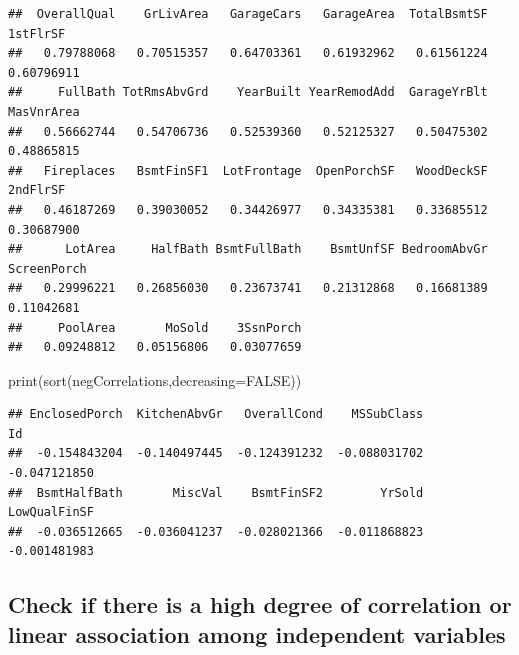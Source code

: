 \documentclass[aoas]{imsart}
\newenvironment{Shaded}{\begin{snugshade}}{\end{snugshade}}
\newcommand{\AttributeTok}[1]{\textcolor[rgb]{0.77,0.63,0.00}{#1}}
\newcommand{\CommentTok}[1]{\textcolor[rgb]{0.56,0.35,0.01}{\textit{#1}}}
\newcommand{\ConstantTok}[1]{\textcolor[rgb]{0.00,0.00,0.00}{#1}}
\newcommand{\FunctionTok}[1]{\textcolor[rgb]{0.00,0.00,0.00}{#1}}
\newcommand{\NormalTok}[1]{#1}
\newcommand{\OtherTok}[1]{\textcolor[rgb]{0.56,0.35,0.01}{#1}}
\newcommand{\SpecialCharTok}[1]{\textcolor[rgb]{0.00,0.00,0.00}{#1}}
\newcommand{\StringTok}[1]{\textcolor[rgb]{0.31,0.60,0.02}{#1}}
\numberwithin{equation}{section}
\theoremstyle{plain}
\theoremstyle{remark}
\begin{document}
\begin{verbatim}
##  OverallQual    GrLivArea   GarageCars   GarageArea  TotalBsmtSF     1stFlrSF 
##   0.79788068   0.70515357   0.64703361   0.61932962   0.61561224   0.60796911 
##     FullBath TotRmsAbvGrd    YearBuilt YearRemodAdd  GarageYrBlt   MasVnrArea 
##   0.56662744   0.54706736   0.52539360   0.52125327   0.50475302   0.48865815 
##   Fireplaces   BsmtFinSF1  LotFrontage  OpenPorchSF   WoodDeckSF     2ndFlrSF 
##   0.46187269   0.39030052   0.34426977   0.34335381   0.33685512   0.30687900 
##      LotArea     HalfBath BsmtFullBath    BsmtUnfSF BedroomAbvGr  ScreenPorch 
##   0.29996221   0.26856030   0.23673741   0.21312868   0.16681389   0.11042681 
##     PoolArea       MoSold    3SsnPorch 
##   0.09248812   0.05156806   0.03077659
\end{verbatim}

\begin{Shaded}
\begin{Highlighting}[]
\FunctionTok{print}\NormalTok{(}\FunctionTok{sort}\NormalTok{(negCorrelations,}\AttributeTok{decreasing=}\ConstantTok{FALSE}\NormalTok{))}
\end{Highlighting}
\end{Shaded}

\begin{verbatim}
## EnclosedPorch  KitchenAbvGr   OverallCond    MSSubClass            Id 
##  -0.154843204  -0.140497445  -0.124391232  -0.088031702  -0.047121850 
##  BsmtHalfBath       MiscVal    BsmtFinSF2        YrSold  LowQualFinSF 
##  -0.036512665  -0.036041237  -0.028021366  -0.011868823  -0.001481983
\end{verbatim}

\hypertarget{check-if-there-is-a-high-degree-of-correlation-or-linear-association-among-independent-variables}{%
\subsection{Check if there is a high degree of correlation or linear
association among independent
variables}\label{check-if-there-is-a-high-degree-of-correlation-or-linear-association-among-independent-variables}}

\begin{Shaded}
\end{Shaded}
\end{document}

